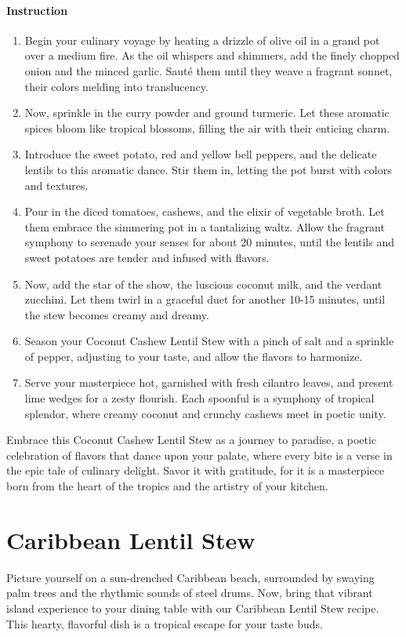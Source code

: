 \paragraph{Instruction}
\begin{enumerate}[noitemsep]
	\item Begin your culinary voyage by heating a drizzle of olive oil in a grand pot over a medium fire. As the oil whispers and shimmers, add the finely chopped onion and the minced garlic. Sauté them until they weave a fragrant sonnet, their colors melding into translucency.
	\item Now, sprinkle in the curry powder and ground turmeric. Let these aromatic spices bloom like tropical blossoms, filling the air with their enticing charm.
	\item Introduce the sweet potato, red and yellow bell peppers, and the delicate lentils to this aromatic dance. Stir them in, letting the pot burst with colors and textures.
	\item Pour in the diced tomatoes, cashews, and the elixir of vegetable broth. Let them embrace the simmering pot in a tantalizing waltz. Allow the fragrant symphony to serenade your senses for about 20 minutes, until the lentils and sweet potatoes are tender and infused with flavors.
	\item Now, add the star of the show, the luscious coconut milk, and the verdant zucchini. Let them twirl in a graceful duet for another 10-15 minutes, until the stew becomes creamy and dreamy.
	\item Season your Coconut Cashew Lentil Stew with a pinch of salt and a sprinkle of pepper, adjusting to your taste, and allow the flavors to harmonize.
	\item Serve your masterpiece hot, garnished with fresh cilantro leaves, and present lime wedges for a zesty flourish. Each spoonful is a symphony of tropical splendor, where creamy coconut and crunchy cashews meet in poetic unity.
\end{enumerate}

Embrace this Coconut Cashew Lentil Stew as a journey to paradise, a poetic celebration of flavors that dance upon your palate, where every bite is a verse in the epic tale of culinary delight. Savor it with gratitude, for it is a masterpiece born from the heart of the tropics and the artistry of your kitchen.

\section{Caribbean Lentil Stew}
\label{caribbeanlentilstew}
Picture yourself on a sun-drenched Caribbean beach, surrounded by swaying palm trees and the rhythmic sounds of steel drums. Now, bring that vibrant island experience to your dining table with our Caribbean Lentil Stew recipe. This hearty, flavorful dish is a tropical escape for your taste buds.


